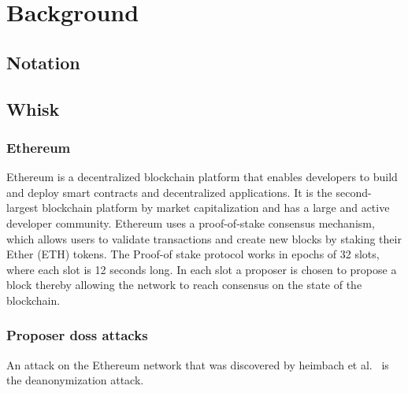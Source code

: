 
\section{Background}\label{sec:background}


\subsection{Notation}\label{sec:background-notation}


\subsection{Whisk}\label{sec:related-work-whisk}

\subsubsection{Ethereum}\label{sec:background-ethereum}
Ethereum is a decentralized blockchain platform that enables developers to build and deploy smart contracts and decentralized applications.
It is the second-largest blockchain platform by market capitalization and has a large and active developer community.
Ethereum uses a proof-of-stake consensus mechanism, which allows users to validate transactions and create new blocks by staking their Ether (ETH) tokens.
The Proof-of stake protocol works in epochs of 32 slots, where each slot is 12 seconds long.
In each slot a proposer is chosen to propose a block thereby allowing the network to reach consensus on the state of the blockchain.

\subsubsection{Proposer doss attacks}\label{sec:background-proposer-doss-attacks}
An attack on the Ethereum network that was discovered by heimbach et al.~\cite{heimbach2024deanonymizingethereumvalidatorsp2p} is the deanonymization attack.


%


